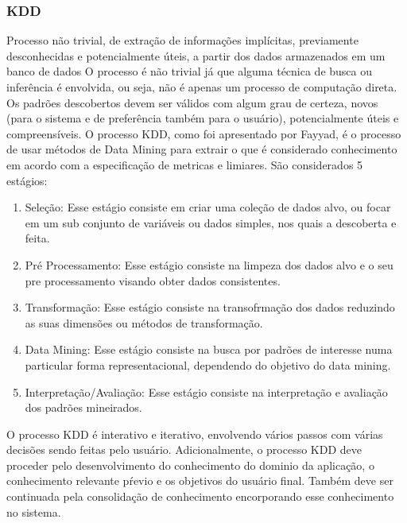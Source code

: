 \documentclass{article}
\begin{document}
\subsubsection{KDD}
Processo não trivial, de extração de informações implícitas, previamente desconhecidas e potencialmente úteis, a partir dos dados armazenados em um banco de dados
\singlespacing
\noindent
O processo é não trivial já que alguma técnica de busca ou inferência é envolvida, ou seja, não é apenas um processo de computação direta. Os padrões descobertos devem ser válidos com algum grau de certeza, novos (para o sistema e de preferência também para o usuário), potencialmente úteis e compreensíveis.
\singlespacing
\noindent
O processo KDD, como foi apresentado por Fayyad, é o processo de usar métodos de Data Mining para extrair o que é considerado conhecimento em acordo com a especificação de metricas e limiares. São considerados 5 estágios:
\begin{enumerate}
    \item Seleção: Esse estágio consiste em criar uma coleção de dados alvo, ou focar em um sub conjunto de variáveis ou dados simples, nos quais a descoberta e feita.
    \item Pré Processamento: Esse estágio consiste na limpeza dos dados alvo e o seu pre processamento visando obter dados consistentes.
    \item Transformação: Esse estágio consiste na transofrmação dos dados reduzindo as suas dimensões ou métodos de transformação.
    \item Data Mining: Esse estágio consiste na busca por padrões de interesse numa particular forma representacional, dependendo do objetivo do data mining.
    \item Interpretação/Avaliação: Esse estágio consiste na interpretação e avaliação dos padrões mineirados.
\end{enumerate}
\noindent
O processo KDD é interativo e iterativo, envolvendo vários passos com várias decisões sendo feitas pelo usuário. Adicionalmente, o processo KDD deve proceder pelo desenvolvimento do conhecimento do dominio da aplicação, o conhecimento relevante pŕevio e os objetivos do usuário final. Também deve ser continuada pela consolidação de conhecimento encorporando esse conhecimento no sistema.
\end{document}
